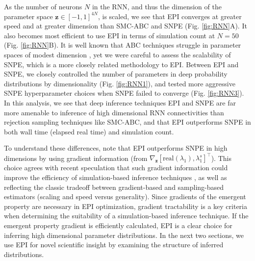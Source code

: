 \documentclass[11pt]{article}
\begin{document}
As the number of neurons $N$ in the RNN, and thus the dimension of the parameter space $\mathbf{z} \in [-1, 1]^{4N}$, is scaled, we see that EPI converges at greater speed and at greater dimension than SMC-ABC and SNPE (Fig. \ref{fig:RNN}A).
It also becomes most efficient to use EPI in terms of simulation count at $N=50$ (Fig. \ref{fig:RNN}B).
It is well known that ABC techniques struggle in parameter spaces of modest dimension \cite{sisson2018handbook}, yet we were careful to assess the scalability of SNPE, which is a more closely related methodology to EPI.
Between EPI and SNPE, we closely controlled the number of parameters in deep probability distributions by dimensionality (Fig. \ref{fig:RNN1}), and tested more aggressive SNPE hyperparameter choices when SNPE failed to converge (Fig. \ref{fig:RNN3}).
In this analysis, we see that deep inference techniques EPI and SNPE are far more amenable to inference of high dimensional RNN connectivities than rejection sampling techniques like SMC-ABC, and that EPI outperforms SNPE in both wall time (elapsed real time) and simulation count.



To understand these differences, note that EPI outperforms SNPE in high dimensions by using gradient information (from $\nabla_\mathbf{z} [\text{real}(\lambda_1), \lambda_1^s]^\top$).
This choice agrees with recent speculation that such gradient information could improve the efficiency of simulation-based inference techniques \cite{cranmer2020frontier}, as well as reflecting the classic tradeoff between gradient-based and sampling-based estimators (scaling and speed versus generality).
Since gradients of the emergent property are necessary in EPI optimization, gradient tractability is a key criteria when determining the suitability of a simulation-based inference technique.
If the emergent property gradient is efficiently calculated, EPI is a clear choice for inferring high dimensional parameter distributions. 
In the next two sections, we use EPI for novel scientific insight by examining the structure of inferred distributions.
\end{document}
